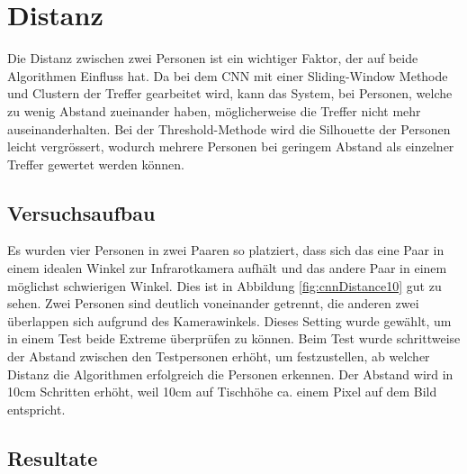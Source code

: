 \section{Distanz}
\label{sec:distanz}

Die Distanz zwischen zwei Personen ist ein wichtiger Faktor, der auf beide Algorithmen Einfluss hat. Da bei dem \gls{CNN} mit einer Sliding-Window Methode und Clustern der Treffer gearbeitet wird, kann das System, bei Personen, welche zu wenig Abstand zueinander haben, möglicherweise die Treffer nicht mehr auseinanderhalten. Bei der Threshold-Methode wird die Silhouette der Personen leicht vergrössert, wodurch mehrere Personen bei geringem Abstand als einzelner Treffer gewertet werden können.

\subsection{Versuchsaufbau}

Es wurden vier Personen in zwei Paaren so platziert, dass sich das eine Paar in einem idealen Winkel zur Infrarotkamera aufhält und das andere Paar in einem möglichst schwierigen Winkel. Dies ist in Abbildung \ref{fig:cnnDistance10} gut zu sehen. Zwei Personen sind deutlich voneinander getrennt, die anderen zwei überlappen sich aufgrund des Kamerawinkels. Dieses Setting wurde gewählt, um in einem Test beide Extreme überprüfen zu können. 
Beim Test wurde schrittweise der Abstand zwischen den Testpersonen erhöht, um festzustellen, ab welcher Distanz die Algorithmen erfolgreich die Personen erkennen. Der Abstand wird in 10cm Schritten erhöht, weil 10cm auf Tischhöhe ca. einem Pixel auf dem Bild entspricht.

\subsection{Resultate}

